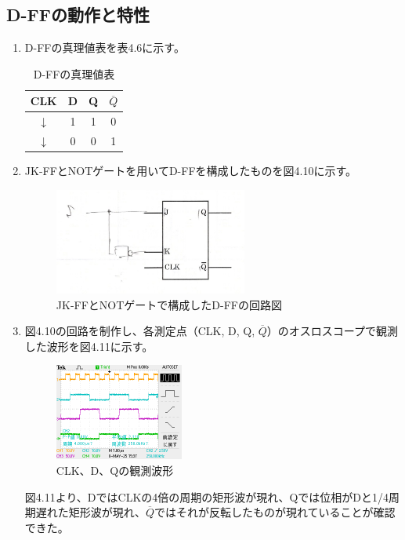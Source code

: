 \documentclass{jlreq}
\numberwithin{equation}{section}
\begin{document}
\subsection{D-FFの動作と特性}
\begin{enumerate}
  \item D-FFの真理値表を表4.6に示す。
  
  \begin{table}[H]
    \centering
    \caption{D-FFの真理値表}
    \begin{tabular}{|c|c|c|c|}
      \hline
      CLK & D & Q & $\overline{Q}$ \\ \hline
      $\downarrow$ & 1 & 1 & 0 \\ \hline
      $\downarrow$ & 0 & 0 & 1 \\ \hline
    \end{tabular}
  \end{table}

  \item JK-FFとNOTゲートを用いてD-FFを構成したものを図4.10に示す。
  
  \begin{figure}[H]
  \centering
  \includegraphics[width=0.6\textwidth]{assets/dffkairo.png}
  \caption{JK-FFとNOTゲートで構成したD-FFの回路図}
  \end{figure}

  \item 図4.10の回路を制作し、各測定点（CLK, D, Q, \(\overline{Q}\)）のオスロスコープで観測した波形を図4.11に示す。
  
  \begin{figure}[H]
  \centering
  \includegraphics[width=0.4\textwidth]{assets/dff.png}
  \caption{CLK、D、Qの観測波形}
  \end{figure}

  図4.11より、DではCLKの4倍の周期の矩形波が現れ、Qでは位相がDと1/4周期遅れた矩形波が現れ、\(\overline{Q}\)ではそれが反転したものが現れていることが確認できた。
\end{enumerate}
\end{document}
